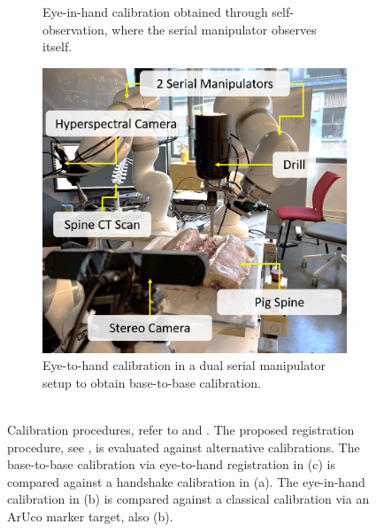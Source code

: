 \begin{figure}
\begin{subfigure}[b]{0.3\textwidth}
         \caption{Eye-in-hand calibration obtained through self-observation, where the serial manipulator observes itself.\\}
         \label{c1:fig:eye_in_hand}
     \end{subfigure}
     \hfill
     \begin{subfigure}[b]{0.3\textwidth}
         \centering
         \includegraphics[width=\textwidth]{fig/eye_to_hand.png}
         \caption{Eye-to-hand calibration in a dual serial manipulator setup to obtain base-to-base calibration.\\\\}
         \label{c1:fig:eye_to_hand}
     \end{subfigure}
    \caption{Calibration procedures, refer to  and . The proposed registration procedure, see , is evaluated against alternative calibrations. The base-to-base calibration via eye-to-hand registration in (c) is compared against a handshake calibration in (a). The eye-in-hand calibration in (b) is compared against a classical calibration via an ArUco marker target, also (b).}
    \label{c1:fig:calibrations}
\end{figure}

